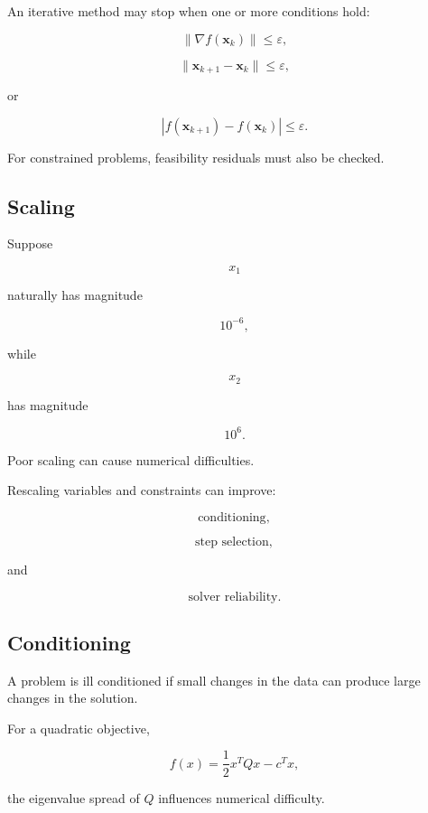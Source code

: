 An iterative method may stop when one or more conditions hold:

\[
\boxed{
\|\nabla f(\mathbf{x}_k)\|
\leq\varepsilon,
}
\]

\[
\boxed{
\|
\mathbf{x}_{k+1}-\mathbf{x}_k
\|
\leq\varepsilon,
}
\]

or

\[
\boxed{
|
f(\mathbf{x}_{k+1})
-
f(\mathbf{x}_k)
|
\leq\varepsilon.
}
\]

For constrained problems, feasibility residuals must also be checked.

\subsection{Scaling}
\label{subsec:optimization-scaling}

Suppose

\[
x_1
\]

naturally has magnitude

\[
10^{-6},
\]

while

\[
x_2
\]

has magnitude

\[
10^6.
\]

Poor scaling can cause numerical difficulties.

Rescaling variables and constraints can improve:

\[
\boxed{
\text{conditioning},
}
\]

\[
\boxed{
\text{step selection},
}
\]

and

\[
\boxed{
\text{solver reliability}.
}
\]

\subsection{Conditioning}
\label{subsec:optimization-conditioning}

A problem is ill conditioned if small changes in the data can produce
large changes in the solution.

For a quadratic objective,

\[
f(x)
=
\frac12x^TQx-c^Tx,
\]

the eigenvalue spread of \(Q\) influences numerical difficulty.

